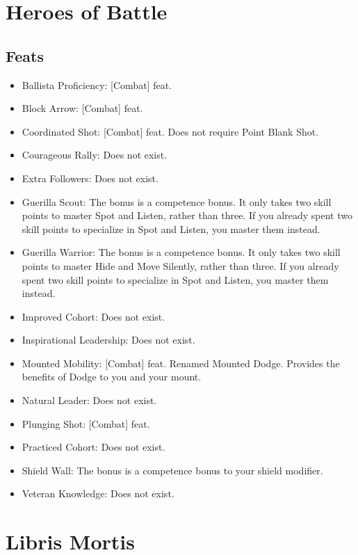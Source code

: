 \section{Heroes of Battle}
\subsection{Feats}
\begin{itemize}
\item Ballista Proficiency: [Combat] feat.
\item Block Arrow: [Combat] feat.
\item Coordinated Shot: [Combat] feat. Does not require Point Blank Shot.
\item Courageous Rally: Does not exist.
\item Extra Followers: Does not exist.
\item Guerilla Scout: The bonus is a competence bonus. It only takes two skill points to master Spot and Listen, rather than three. If you already spent two skill points to specialize in Spot and Listen, you master them instead.
\item Guerilla Warrior: The bonus is a competence bonus. It only takes two skill points to master Hide and Move Silently, rather than three. If you already spent two skill points to specialize in Spot and Listen, you master them instead.
\item Improved Cohort: Does not exist.
\item Inspirational Leadership: Does not exist.
\item Mounted Mobility: [Combat] feat. Renamed Mounted Dodge. Provides the benefits of Dodge to you and your mount.
\item Natural Leader: Does not exist.
\item Plunging Shot: [Combat] feat.
\item Practiced Cohort: Does not exist.
\item Shield Wall: The bonus is a competence bonus to your shield modifier.
\item Veteran Knowledge: Does not exist.
\end{itemize}

\section{Libris Mortis}
